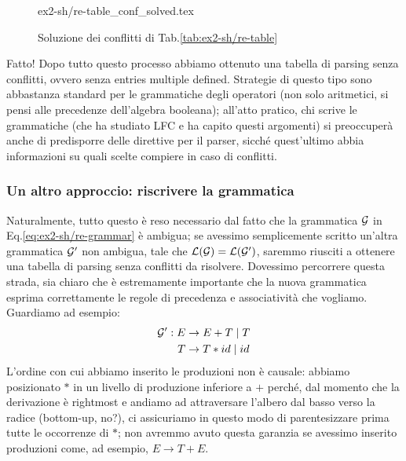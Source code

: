 \documentclass[class=book, crop=false, oneside, 12pt]{standalone}
\begin{document}
\begin{figure}[H]
    \centering
    {ex2-sh/re-table_conf_solved.tex}
    \caption{Soluzione dei conflitti di Tab.\ref{tab:ex2-sh/re-table}}
    \label{tab:ex2-sh/re-table_conf_solved}
\end{figure}
Fatto! Dopo tutto questo processo abbiamo ottenuto una tabella di parsing senza conflitti, ovvero senza entries multiple defined. Strategie di questo tipo sono abbastanza standard per le grammatiche degli operatori (non solo aritmetici, si pensi alle precedenze dell'algebra booleana); all'atto pratico, chi scrive le grammatiche (che ha studiato LFC e ha capito questi argomenti) si preoccuperà anche di predisporre delle direttive per il parser, sicché quest'ultimo abbia informazioni su quali scelte compiere in caso di conflitti.

\subsubsection{Un altro approccio: riscrivere la grammatica}
Naturalmente, tutto questo è reso necessario dal fatto che la grammatica \(\mathcal{G}\) in Eq.\ref{eq:ex2-sh/re-grammar} è ambigua; se avessimo semplicemente scritto un'altra grammatica \(\mathcal{G}'\) non ambigua, tale che \(\mathcal{L}(\mathcal{G}) = \mathcal{L}(\mathcal{G}')\), saremmo riusciti a ottenere una tabella di parsing senza conflitti da risolvere. Dovessimo percorrere questa strada, sia chiaro che è estremamente importante che la nuova grammatica esprima correttamente le regole di precedenza e associatività che vogliamo. Guardiamo ad esempio:
\begin{align}
    \label{eq:ex2-sh/re-grammar_v2}
    \mathcal{G}': E &\to E + T \mid T \\
    T &\to T * id \mid id \notag
\end{align}
L'ordine con cui abbiamo inserito le produzioni non è causale: abbiamo posizionato \(*\) in un livello di produzione inferiore a \(+\) perché, dal momento che la derivazione è rightmost e andiamo ad attraversare l'albero dal basso verso la radice (bottom-up, no?), ci assicuriamo in questo modo di parentesizzare prima tutte le occorrenze di \(\ast\); non avremmo avuto questa garanzia se avessimo inserito produzioni come, ad esempio, \(E \to T + E\). 
\end{document}
